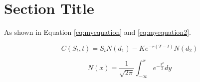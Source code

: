 \label{chapter:experiments}

\Blindtext [1]

\section{Section Title}
\Blindtext [1] As shown in Equation \ref{eq:myequation} and \ref{eq:myequation2}.

\begin{equation}
\label{eq:myequation}
    C\left(S_{t}, t\right)=S_{t} N\left(d_{1}\right)-K e^{-r(T-t)} N\left(d_{2}\right)
\end{equation}

\begin{equation}
\label{eq:myequation2}
    N(x)=\frac{1}{\sqrt{2 \pi}} \int_{-\infty}^{x} e^{-\frac{y^{2}}{2}} d y
\end{equation}

\Blindtext [1]